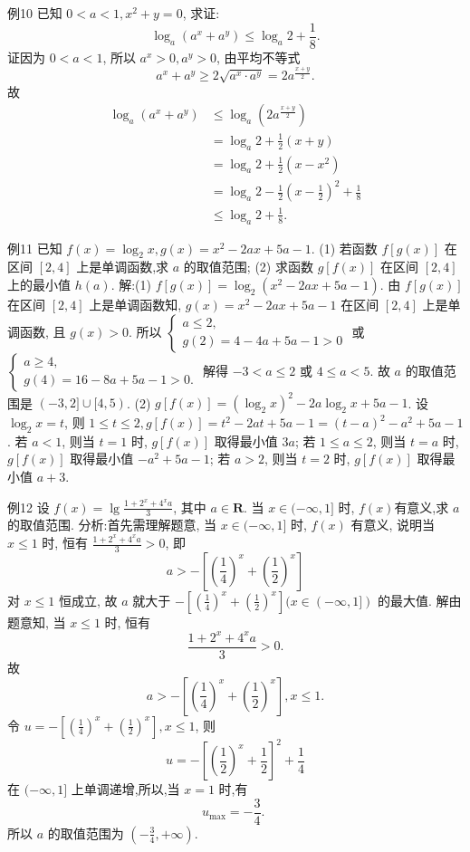 例10 已知 $0<a<1, x^2+y=0$, 求证:
$$
\log _a\left(a^x+a^y\right) \leqslant \log _a 2+\frac{1}{8} .
$$
证因为 $0<a<1$, 所以 $a^x>0, a^y>0$, 由平均不等式
$$
a^x+a^y \geqslant 2 \sqrt{a^x \cdot a^y}=2 a^{\frac{x+y}{2}} .
$$
故
$$
\begin{aligned}
\log _a\left(a^x+a^y\right) & \leqslant \log _a\left(2 a^{\frac{x+y}{2}}\right) \\
& =\log _a 2+\frac{1}{2}(x+y) \\
& =\log _a 2+\frac{1}{2}\left(x-x^2\right) \\
& =\log _a 2-\frac{1}{2}\left(x-\frac{1}{2}\right)^2+\frac{1}{8} \\
& \leqslant \log _a 2+\frac{1}{8} .
\end{aligned}
$$



例11 已知 $f(x)=\log _2 x, g(x)=x^2-2 a x+5 a-1$.
(1) 若函数 $f[g(x)]$ 在区间 $[2,4]$ 上是单调函数,求 $a$ 的取值范围;
(2) 求函数 $g[f(x)]$ 在区间 $[2,4]$ 上的最小值 $h(a)$.
解:(1) $f[g(x)]=\log _2\left(x^2-2 a x+5 a-1\right)$.
由 $f[g(x)]$ 在区间 $[2,4]$ 上是单调函数知, $g(x)=x^2-2 a x+5 a-1$ 在区间 $[2,4]$ 上是单调函数, 且 $g(x)>0$.
所以 $\left\{\begin{array}{l}a \leqslant 2, \\ g(2)=4-4 a+5 a-1>0\end{array}\right.$ 或 $\left\{\begin{array}{l}a \geqslant 4, \\ g(4)=16-8 a+5 a-1>0 .\end{array}\right.$
解得 $-3<a \leqslant 2$ 或 $4 \leqslant a<5$.
故 $a$ 的取值范围是 $(-3,2] \cup[4,5)$.
(2) $g[f(x)]=\left(\log _2 x\right)^2-2 a \log _2 x+5 a-1$.
设 $\log _2 x=t$, 则 $1 \leqslant t \leqslant 2, g[f(x)]=t^2-2 a t+5 a-1=(t-a)^2- a^2+5 a-1$.
若 $a<1$, 则当 $t=1$ 时, $g[f(x)]$ 取得最小值 $3 a$;
若 $1 \leqslant a \leqslant 2$, 则当 $t=a$ 时, $g[f(x)]$ 取得最小值 $-a^2+5 a-1$;
若 $a>2$, 则当 $t=2$ 时, $g[f(x)]$ 取得最小值 $a+3$.



例12 设 $f(x)=\lg \frac{1+2^x+4^x a}{3}$, 其中 $a \in \mathbf{R}$. 当 $x \in(-\infty, 1]$ 时, $f(x)$有意义,求 $a$ 的取值范围.
分析:首先需理解题意, 当 $x \in(-\infty, 1]$ 时, $f(x)$ 有意义, 说明当 $x \leqslant 1$ 时, 恒有 $\frac{1+2^x+4^x a}{3}>0$, 即
$$
a>-\left[\left(\frac{1}{4}\right)^x+\left(\frac{1}{2}\right)^x\right]
$$
对 $x \leqslant 1$ 恒成立, 故 $a$ 就大于 $-\left[\left(\frac{1}{4}\right)^x+\left(\frac{1}{2}\right)^x\right](x \in(-\infty, 1])$ 的最大值.
解由题意知, 当 $x \leqslant 1$ 时, 恒有
$$
\frac{1+2^x+4^x a}{3}>0 .
$$
故
$$
a>-\left[\left(\frac{1}{4}\right)^x+\left(\frac{1}{2}\right)^x\right], x \leqslant 1 .
$$
令 $u=-\left[\left(\frac{1}{4}\right)^x+\left(\frac{1}{2}\right)^x\right], x \leqslant 1$, 则
$$
u=-\left[\left(\frac{1}{2}\right)^x+\frac{1}{2}\right]^2+\frac{1}{4}
$$
在 $(-\infty, 1]$ 上单调递增,所以,当 $x=1$ 时,有
$$
u_{\max }=-\frac{3}{4} \text {. }
$$
所以 $a$ 的取值范围为 $\left(-\frac{3}{4},+\infty\right)$.



